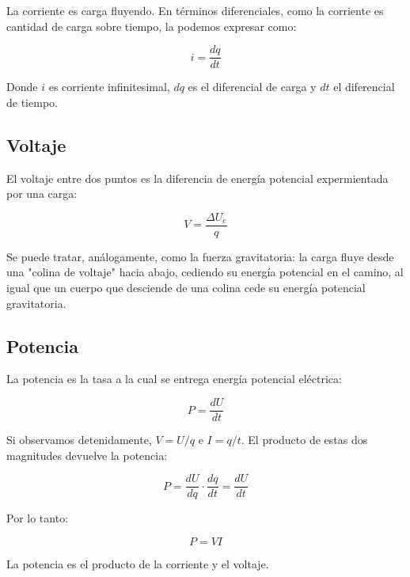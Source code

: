 La corriente es carga fluyendo.
En términos diferenciales,
como la corriente es cantidad de carga sobre tiempo, 
la podemos expresar como:

\begin{equation*}
    i = \frac{dq}{dt}
\end{equation*}

Donde \(i\) es corriente infinitesimal,
\(dq\) es el diferencial de carga y \(dt\) el diferencial de tiempo.

\subsection{Voltaje}

El voltaje entre dos puntos es la diferencia de energía potencial expermientada por una carga:

\begin{equation*}
    V = \frac{\Delta U_e}{q}
\end{equation*}

Se puede tratar, análogamente,
como la fuerza gravitatoria:
la carga fluye desde una "colina de voltaje" hacia abajo,
cediendo su energía potencial en el camino,
al igual que un cuerpo que desciende de una colina cede su energía potencial gravitatoria.

\subsection{Potencia}

La potencia es la tasa a la cual se entrega energía potencial eléctrica:

\begin{equation*}
    P = \frac{dU}{dt}
\end{equation*}

Si observamos detenidamente, \(V = U/q\) e \(I = q/t\).
El producto de estas dos magnitudes devuelve la potencia:

\begin{equation*}
    P = \frac{dU}{dq} \cdot \frac{dq}{dt} = \frac{dU}{dt}
\end{equation*}

Por lo tanto:

\begin{equation*}
    P = VI
\end{equation*}

La potencia es el producto de la corriente y el voltaje.